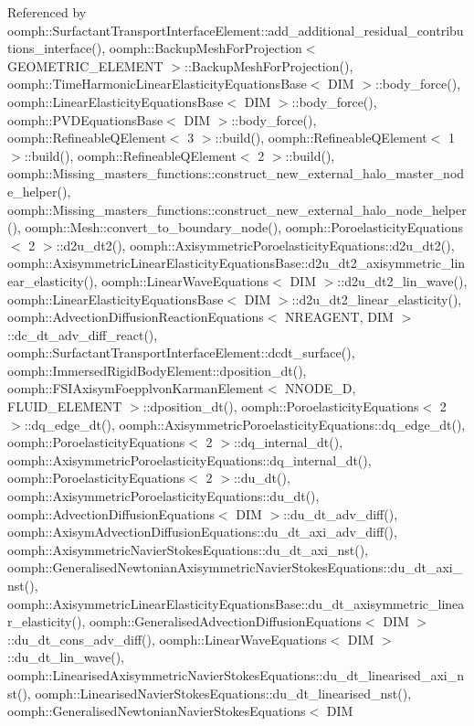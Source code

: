 Referenced by oomph\+::\+Surfactant\+Transport\+Interface\+Element\+::add\+\_\+additional\+\_\+residual\+\_\+contributions\+\_\+interface(), oomph\+::\+Backup\+Mesh\+For\+Projection$<$ G\+E\+O\+M\+E\+T\+R\+I\+C\+\_\+\+E\+L\+E\+M\+E\+N\+T $>$\+::\+Backup\+Mesh\+For\+Projection(), oomph\+::\+Time\+Harmonic\+Linear\+Elasticity\+Equations\+Base$<$ D\+I\+M $>$\+::body\+\_\+force(), oomph\+::\+Linear\+Elasticity\+Equations\+Base$<$ D\+I\+M $>$\+::body\+\_\+force(), oomph\+::\+P\+V\+D\+Equations\+Base$<$ D\+I\+M $>$\+::body\+\_\+force(), oomph\+::\+Refineable\+Q\+Element$<$ 3 $>$\+::build(), oomph\+::\+Refineable\+Q\+Element$<$ 1 $>$\+::build(), oomph\+::\+Refineable\+Q\+Element$<$ 2 $>$\+::build(), oomph\+::\+Missing\+\_\+masters\+\_\+functions\+::construct\+\_\+new\+\_\+external\+\_\+halo\+\_\+master\+\_\+node\+\_\+helper(), oomph\+::\+Missing\+\_\+masters\+\_\+functions\+::construct\+\_\+new\+\_\+external\+\_\+halo\+\_\+node\+\_\+helper(), oomph\+::\+Mesh\+::convert\+\_\+to\+\_\+boundary\+\_\+node(), oomph\+::\+Poroelasticity\+Equations$<$ 2 $>$\+::d2u\+\_\+dt2(), oomph\+::\+Axisymmetric\+Poroelasticity\+Equations\+::d2u\+\_\+dt2(), oomph\+::\+Axisymmetric\+Linear\+Elasticity\+Equations\+Base\+::d2u\+\_\+dt2\+\_\+axisymmetric\+\_\+linear\+\_\+elasticity(), oomph\+::\+Linear\+Wave\+Equations$<$ D\+I\+M $>$\+::d2u\+\_\+dt2\+\_\+lin\+\_\+wave(), oomph\+::\+Linear\+Elasticity\+Equations\+Base$<$ D\+I\+M $>$\+::d2u\+\_\+dt2\+\_\+linear\+\_\+elasticity(), oomph\+::\+Advection\+Diffusion\+Reaction\+Equations$<$ N\+R\+E\+A\+G\+E\+N\+T, D\+I\+M $>$\+::dc\+\_\+dt\+\_\+adv\+\_\+diff\+\_\+react(), oomph\+::\+Surfactant\+Transport\+Interface\+Element\+::dcdt\+\_\+surface(), oomph\+::\+Immersed\+Rigid\+Body\+Element\+::dposition\+\_\+dt(), oomph\+::\+F\+S\+I\+Axisym\+Foepplvon\+Karman\+Element$<$ N\+N\+O\+D\+E\+\_\+D, F\+L\+U\+I\+D\+\_\+\+E\+L\+E\+M\+E\+N\+T $>$\+::dposition\+\_\+dt(), oomph\+::\+Poroelasticity\+Equations$<$ 2 $>$\+::dq\+\_\+edge\+\_\+dt(), oomph\+::\+Axisymmetric\+Poroelasticity\+Equations\+::dq\+\_\+edge\+\_\+dt(), oomph\+::\+Poroelasticity\+Equations$<$ 2 $>$\+::dq\+\_\+internal\+\_\+dt(), oomph\+::\+Axisymmetric\+Poroelasticity\+Equations\+::dq\+\_\+internal\+\_\+dt(), oomph\+::\+Poroelasticity\+Equations$<$ 2 $>$\+::du\+\_\+dt(), oomph\+::\+Axisymmetric\+Poroelasticity\+Equations\+::du\+\_\+dt(), oomph\+::\+Advection\+Diffusion\+Equations$<$ D\+I\+M $>$\+::du\+\_\+dt\+\_\+adv\+\_\+diff(), oomph\+::\+Axisym\+Advection\+Diffusion\+Equations\+::du\+\_\+dt\+\_\+axi\+\_\+adv\+\_\+diff(), oomph\+::\+Axisymmetric\+Navier\+Stokes\+Equations\+::du\+\_\+dt\+\_\+axi\+\_\+nst(), oomph\+::\+Generalised\+Newtonian\+Axisymmetric\+Navier\+Stokes\+Equations\+::du\+\_\+dt\+\_\+axi\+\_\+nst(), oomph\+::\+Axisymmetric\+Linear\+Elasticity\+Equations\+Base\+::du\+\_\+dt\+\_\+axisymmetric\+\_\+linear\+\_\+elasticity(), oomph\+::\+Generalised\+Advection\+Diffusion\+Equations$<$ D\+I\+M $>$\+::du\+\_\+dt\+\_\+cons\+\_\+adv\+\_\+diff(), oomph\+::\+Linear\+Wave\+Equations$<$ D\+I\+M $>$\+::du\+\_\+dt\+\_\+lin\+\_\+wave(), oomph\+::\+Linearised\+Axisymmetric\+Navier\+Stokes\+Equations\+::du\+\_\+dt\+\_\+linearised\+\_\+axi\+\_\+nst(), oomph\+::\+Linearised\+Navier\+Stokes\+Equations\+::du\+\_\+dt\+\_\+linearised\+\_\+nst(), oomph\+::\+Generalised\+Newtonian\+Navier\+Stokes\+Equations$<$ D\+I\+M 